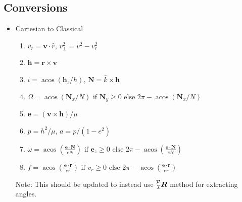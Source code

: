 \documentclass[twocolumn]{article}    %
\begin{document}
\subsection*{Conversions}
\begin{itemize}
    \item Cartesian to Classical
    \begin{enumerate}
        \item \(v_r = \bm{v} \cdot \hat{r}\), \(v_\perp^2 = v^2 - v_r^2\)
        \item \(\bm{h} = \bm{r} \times \bm{v}\)
        \item \(i = \operatorname{acos}(\bm{h}_z / h)\), \(\bm{N} = \hat{k} \times \bm{h}\)
        \item \(\Omega = \operatorname{acos}(\bm{N}_x/N) \text{ if } \bm{N}_y \geq0 \text{ else }2\pi -\operatorname{acos}(\bm{N}_x/N)\)
        \item \(\bm{e} = (\bm{v}\times \bm{h})/\mu\)
        \item \(p = h^2/\mu\), \(a = p/(1-e^2)\)
        \item \(\omega = \operatorname{acos}(\frac{\bm{e}\cdot \bm{N}}{eN}) \text{ if } \bm{e}_z\geq0 \text{ else } 2\pi - \operatorname{acos}(\frac{\bm{e}\cdot \bm{N}}{eN})\)
        \item \(f = \operatorname{acos} (\frac{\bm{e}\cdot\bm{r}}{er}) \text{ if } v_r\geq 0 \text{ else }2\pi - \operatorname{acos} (\frac{\bm{e}\cdot\bm{r}}{er})\)
    \end{enumerate}
    Note: This should be updated to instead use \(\prescript{\mathcal{P}}{\mathcal{I}}{\bm{R}}\) method for extracting angles.


\end{itemize}
\end{document}
